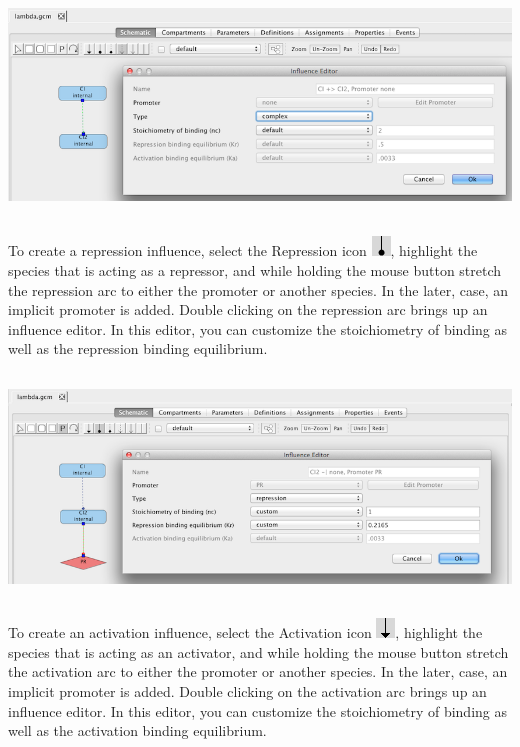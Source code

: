 \documentclass[titlepage,11pt]{article}
\begin{document}
\begin{center}
\includegraphics[height=60mm]{screenshots/complex} 
\end{center}

To create a repression influence, select the Repression icon 
\includegraphics{../gui/icons/modelview/inhibition_selected}, highlight the species that is acting as a repressor, and while holding the mouse button stretch the repression arc to either the promoter or another species.  In the later, case, an implicit promoter is added.  Double clicking on the repression arc brings up an influence editor.  In this editor, you can customize the stoichiometry of binding as well as the repression binding equilibrium.

\begin{center}
\includegraphics[height=60mm]{screenshots/repression} 
\end{center}

To create an activation influence, select the Activation icon 
\includegraphics{../gui/icons/modelview/activation_selected}, highlight the species that is acting as an activator, and while holding the mouse button stretch the activation arc to either the promoter or another species.  In the later, case, an implicit promoter is added.  Double clicking on the activation arc brings up an influence editor.  In this editor, you can customize the stoichiometry of binding as well as the activation binding equilibrium.
\end{document}
